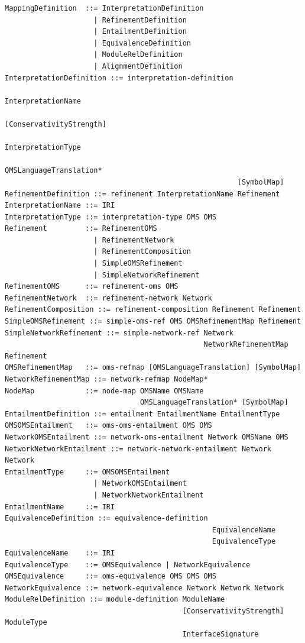 \documentclass[10pt,fleqn,final]{scrreprt}
\newenvironment{definitions}[0]{\medskip }{}
\begin{document}
\begin{definitions}
\begin{lstlisting}[language=ebnf,escapeinside={<>},mathescape]
MappingDefinition  ::= InterpretationDefinition
                     | RefinementDefinition
                     | EntailmentDefinition
                     | EquivalenceDefinition
                     | ModuleRelDefinition
                     | AlignmentDefinition
InterpretationDefinition ::= interpretation-definition
                                                       InterpretationName
                                                       [ConservativityStrength]
                                                       InterpretationType
                                                       OMSLanguageTranslation*
                                                       [SymbolMap]
RefinementDefinition ::= refinement InterpretationName Refinement
InterpretationName ::= IRI
InterpretationType ::= interpretation-type OMS OMS
Refinement         ::= RefinementOMS
                     | RefinementNetwork
                     | RefinementComposition
                     | SimpleOMSRefinement
                     | SimpleNetworkRefinement
RefinementOMS      ::= refinement-oms OMS
RefinementNetwork  ::= refinement-network Network
RefinementComposition ::= refinement-composition Refinement Refinement
SimpleOMSRefinement ::= simple-oms-ref OMS OMSRefinementMap Refinement
SimpleNetworkRefinement ::= simple-network-ref Network
                                               NetworkRefinementMap Refinement
OMSRefinementMap   ::= oms-refmap [OMSLanguageTranslation] [SymbolMap]
NetworkRefinementMap ::= network-refmap NodeMap*
NodeMap            ::= node-map OMSName OMSName
                                OMSLanguageTranslation* [SymbolMap]
EntailmentDefinition ::= entailment EntailmentName EntailmentType
OMSOMSEntailment   ::= oms-oms-entailment OMS OMS
NetworkOMSEntailment ::= network-oms-entailment Network OMSName OMS
NetworkNetworkEntailment ::= network-network-entailment Network Network
EntailmentType     ::= OMSOMSEntailment
                     | NetworkOMSEntailment
                     | NetworkNetworkEntailment
EntailmentName     ::= IRI
EquivalenceDefinition ::= equivalence-definition
                                                 EquivalenceName
                                                 EquivalenceType
EquivalenceName    ::= IRI
EquivalenceType    ::= OMSEquivalence | NetworkEquivalence
OMSEquivalence     ::= oms-equivalence OMS OMS OMS
NetworkEquivalence ::= network-equivalence Network Network Network
ModuleRelDefinition ::= module-definition ModuleName
                                          [ConservativityStrength] ModuleType
                                          InterfaceSignature

\end{lstlisting}
\end{definitions}
\end{document}
